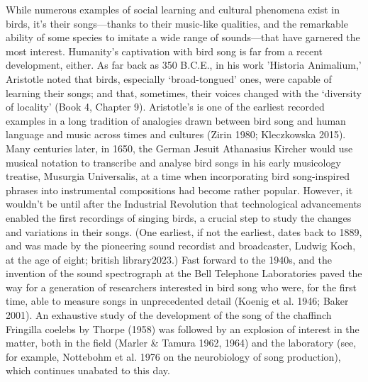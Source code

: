 While numerous examples of social learning and cultural phenomena exist in birds, it's their songs---thanks to their music-like qualities, and the remarkable ability of some species to imitate a wide range of sounds---that have garnered the most interest. Humanity’s captivation with bird song is far from a recent development, either. As far back as 350 B.C.E., in his work 'Historia Animalium,' Aristotle noted that birds, especially ‘broad-tongued’ ones, were capable of learning their songs; and that, sometimes, their voices changed with the ‘diversity of locality’ (Book 4, Chapter 9). Aristotle’s is one of the earliest recorded examples in a long tradition of analogies drawn between bird song and human language and music across times and cultures (Zirin 1980; Kleczkowska 2015).
Many centuries later, in 1650, the German Jesuit Athanasius Kircher would use musical notation to transcribe and analyse bird songs in his early musicology treatise, Musurgia Universalis, at a time when incorporating bird song-inspired phrases into instrumental compositions had become rather popular. However, it wouldn't be until after the Industrial Revolution that technological advancements enabled the first recordings of singing birds, a crucial step to study the changes and variations in their songs. (One earliest, if not the earliest, dates back to 1889, and was made by the pioneering sound recordist and broadcaster, Ludwig Koch, at the age of eight; british library2023.) Fast forward to the 1940s, and the invention of the sound spectrograph at the Bell Telephone Laboratories paved the way for a generation of researchers interested in bird song who were, for the first time, able to measure songs in unprecedented detail (Koenig et al. 1946; Baker 2001). An exhaustive study of the development of the song of the chaffinch Fringilla coelebs by Thorpe (1958) was followed by an explosion of interest in the matter, both in the field (Marler \& Tamura 1962, 1964) and the laboratory (see, for example, Nottebohm et al. 1976 on the neurobiology of song production), which continues unabated to this day. 